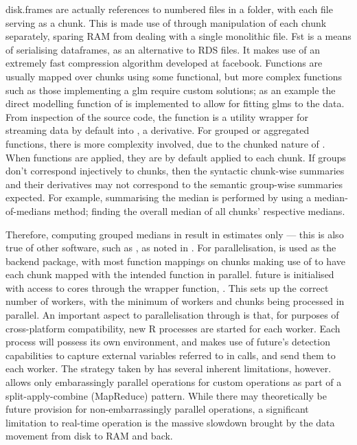 disk.frames are actually references to numbered  files in a
folder, with each file serving as a chunk.
This is made use of through manipulation of each chunk separately,
sparing RAM from dealing with a single monolithic
file\cite{zj19:_inges_data}.
Fst is a means of serialising dataframes, as an alternative to RDS
files\cite{klik19}.
It makes use of an extremely fast compression algorithm developed at
facebook.
Functions are usually mapped over chunks using some functional, but more
complex functions such as those implementing a glm require custom
solutions; as an example the direct modelling function of
 is implemented to allow
for fitting glms to the data.
From inspection of the source code, the function is a utility wrapper
for streaming  data by default into , a 
derivative.
For grouped or aggregated functions, there is more complexity involved,
due to the chunked nature of .
When functions are applied, they are by default applied to each chunk.
If groups don't correspond injectively to chunks, then the syntactic
chunk-wise summaries and their derivatives may not correspond to the
semantic group-wise summaries expected.
For example, summarising the median is performed by using a
median-of-medians method; finding the overall median of all chunks'
respective medians.

Therefore, computing grouped medians in  result in estimates
only --- this is also true of other software, such as , as noted in
\cite{zj19:_group_by}.
For parallelisation,  is used as the backend package, with most
function mappings on chunks making use of
to have each chunk mapped with the intended function in parallel.
future is initialised with access to cores through the wrapper function,
\cite{zj19:_key}.
This sets up the correct number of workers, with the minimum of workers
and chunks being processed in parallel.
An important aspect to parallelisation through  is that, for
purposes of cross-platform compatibility, new R processes are started
for each worker\cite{zj19:_using}.
Each process will possess its own environment, and  makes use
of future's detection capabilities to capture external variables
referred to in calls, and send them to each worker.
The strategy taken by  has several inherent
limitations, however.  allows only embarassingly
parallel operations for custom operations as part of a
split-apply-combine (MapReduce) pattern.
While there may theoretically be future provision for non-embarrassingly
parallel operations, a significant limitation to real-time operation is
the massive slowdown brought by the data movement from disk to RAM and
back.

